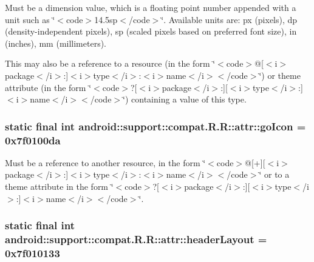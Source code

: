 Must be a dimension value, which is a floating point number appended with a unit such as \char`\"{}$<$code$>$14.5sp$<$/code$>$\char`\"{}. Available units are: px (pixels), dp (density-independent pixels), sp (scaled pixels based on preferred font size), in (inches), mm (millimeters). 

This may also be a reference to a resource (in the form \char`\"{}$<$code$>$@\mbox{[}$<$i$>$package$<$/i$>$:\mbox{]}$<$i$>$type$<$/i$>$:$<$i$>$name$<$/i$>$$<$/code$>$\char`\"{}) or theme attribute (in the form \char`\"{}$<$code$>$?\mbox{[}$<$i$>$package$<$/i$>$:\mbox{]}\mbox{[}$<$i$>$type$<$/i$>$:\mbox{]}$<$i$>$name$<$/i$>$$<$/code$>$\char`\"{}) containing a value of this type. \hypertarget{classandroid_1_1support_1_1compat_1_1_r_1_1attr_36047910d734fb35b80bc7e3990872a1}{
\subsubsection[{goIcon}]{\setlength{\rightskip}{0pt plus 5cm}static final int android::support::compat.R.R::attr::goIcon = 0x7f0100da}}
\label{classandroid_1_1support_1_1compat_1_1_r_1_1attr_36047910d734fb35b80bc7e3990872a1}


Must be a reference to another resource, in the form \char`\"{}$<$code$>$@\mbox{[}+\mbox{]}\mbox{[}$<$i$>$package$<$/i$>$:\mbox{]}$<$i$>$type$<$/i$>$:$<$i$>$name$<$/i$>$$<$/code$>$\char`\"{} or to a theme attribute in the form \char`\"{}$<$code$>$?\mbox{[}$<$i$>$package$<$/i$>$:\mbox{]}\mbox{[}$<$i$>$type$<$/i$>$:\mbox{]}$<$i$>$name$<$/i$>$$<$/code$>$\char`\"{}. \hypertarget{classandroid_1_1support_1_1compat_1_1_r_1_1attr_292d93fd759f9b78169d2157caacdffb}{
\subsubsection[{headerLayout}]{\setlength{\rightskip}{0pt plus 5cm}static final int android::support::compat.R.R::attr::headerLayout = 0x7f010133}}
\label{classandroid_1_1support_1_1compat_1_1_r_1_1attr_292d93fd759f9b78169d2157caacdffb}


